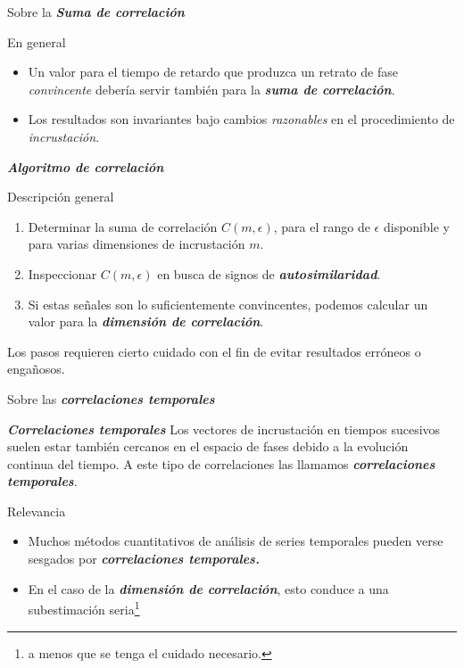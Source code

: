 \documentclass[11pt]{beamer}
\begin{document}
\begin{frame}{Sobre la \textbf{\textit{Suma de correlación}}}
\begin{block}{En general}
\begin{itemize}
\item Un valor para el tiempo de retardo que produzca un retrato de fase \textit{convincente} debería servir también para la \textbf{\textit{suma de correlación}}.
\item Los resultados son invariantes bajo cambios \textit{razonables} en el procedimiento de \textit{incrustación}.
\end{itemize}
\end{block}
\end{frame}

\begin{frame}{\textbf{\textit{Algoritmo de correlación}}}
\begin{block}{Descripción general}
\begin{enumerate}
\item Determinar la suma de correlación $C(m, \epsilon)$, para el rango de $\epsilon$ disponible y para varias dimensiones de incrustación $m$.
\item Inspeccionar $C(m, \epsilon)$ en busca de signos de \textbf{\textit{autosimilaridad}}.
\item Si estas señales son lo suficientemente convincentes, podemos calcular un valor para la \textbf{\textit{dimensión de correlación}}.
\end{enumerate}
Los pasos requieren cierto cuidado con el fin de evitar resultados erróneos o engañosos. 
\end{block}
\end{frame}

\begin{frame}{Sobre las \textbf{\textit{correlaciones temporales}}}
\begin{block}{\textbf{\textit{Correlaciones temporales}}}
Los vectores de incrustación en tiempos sucesivos suelen estar también cercanos en el espacio de fases debido a la evolución continua del tiempo. A este tipo de correlaciones las llamamos \textbf{\textit{correlaciones temporales}}.
\end{block}
\begin{block}{Relevancia}
\begin{itemize}
\item Muchos métodos cuantitativos de análisis de series temporales pueden verse sesgados por \textbf{\textit{correlaciones temporales.}} 
\item En el caso de la \textbf{\textit{dimensión de correlación}}, esto conduce a una subestimación seria\footnote{a menos que se tenga el cuidado necesario.} 
\end{itemize}
\end{block}
\end{frame}
\end{document}
